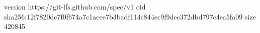 version https://git-lfs.github.com/spec/v1
oid sha256:12f7820dc7f0f674a7c1acee7b3badf114c844ec9f9dec372dbd797c4ea5fa09
size 420845
